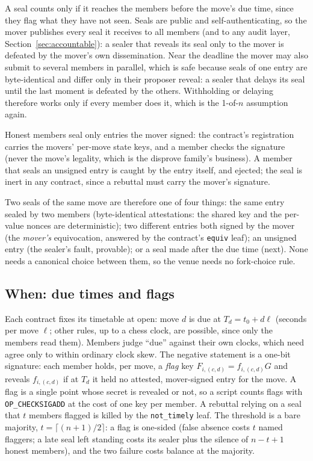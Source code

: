 \documentclass[11pt]{article}
\newcommand{\op}[1]{\texttt{OP\_#1}}
\begin{document}
A seal counts only if it reaches the members before the move's due time,
since they flag what they have not seen. Seals are public and
self-authenticating, so the mover publishes every seal it receives to
all members (and to any audit layer, Section~\ref{sec:accountable}): a
sealer that reveals its seal only to the mover is defeated by the
mover's own dissemination. Near the deadline the mover may also submit
to several members in parallel, which is safe because seals of one entry
are byte-identical and differ only in their proposer reveal: a sealer
that delays its seal until the last moment is defeated by the others.
Withholding or delaying therefore works only if every member does it,
which is the 1-of-$n$ assumption again.

Honest members seal only entries the mover signed: the contract's
registration carries the movers' per-move state keys, and a member
checks the signature (never the move's legality, which is the disprove
family's business). A member that seals an unsigned entry is caught by
the entry itself, and ejected; the seal is inert in any contract, since
a rebuttal must carry the mover's signature.

Two seals of the same move are therefore one of four things: the same
entry sealed by two members (byte-identical attestations: the shared
key and the per-value nonces are deterministic); two different entries
both signed by the mover (the \emph{mover's} equivocation, answered by
the contract's \texttt{equiv} leaf); an unsigned entry (the sealer's
fault, provable); or a seal made after the due time (next). None needs
a canonical choice between them, so the venue needs no fork-choice rule.

\subsection{When: due times and flags}

Each contract fixes its timetable at open: move $d$ is due at
$T_d = t_0 + d\ell$ (seconds per move $\ell$; other rules, up to a chess
clock, are possible, since only the members read them). Members judge
``due'' against their own clocks, which need agree only to within
ordinary clock skew. The negative statement is a one-bit signature: each
member holds, per move, a \emph{flag} key $F_{i,(c,d)} = f_{i,(c,d)}G$
and reveals $f_{i,(c,d)}$ if at $T_d$ it held no attested, mover-signed
entry for the move. A flag is a single point whose secret is revealed or
not, so a script counts flags with \op{CHECKSIGADD} at the cost of one key
per member. A rebuttal relying on a seal that $t$ members flagged is
killed by the \texttt{not\_timely} leaf. The threshold is a bare
majority, $t = \lceil (n+1)/2 \rceil$: a flag is one-sided (false
absence costs $t$ named flaggers; a late seal left standing costs its
sealer plus the silence of $n - t + 1$ honest members), and the two
failure costs balance at the majority.
\end{document}
